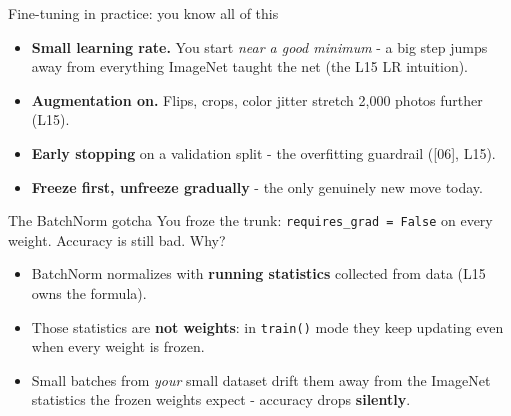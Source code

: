 \documentclass[aspectratio=169]{beamer}
\begin{document}
\begin{frame}{Fine-tuning in practice: you know all of this}
  \begin{itemize}
    \item \textbf{Small learning rate.} You start \emph{near a good minimum} - a big step
      jumps away from everything ImageNet taught the net (the L15 LR intuition).
    \item \textbf{Augmentation on.} Flips, crops, color jitter stretch 2,000 photos
      further (L15).
    \item \textbf{Early stopping} on a validation split - the overfitting guardrail
      ([06], L15).
    \item \textbf{Freeze first, unfreeze gradually} - the only genuinely new move today.
  \end{itemize}
  \vskip 8pt
\end{frame}

\begin{frame}{The BatchNorm gotcha}
  You froze the trunk: \texttt{requires\_grad = False} on every weight. Accuracy is
  still bad. Why?
  \vskip 6pt
  \begin{itemize}
    \item BatchNorm normalizes with \textbf{running statistics} collected from data
      (L15 owns the formula).
    \item Those statistics are \textbf{not weights}: in \texttt{train()} mode they keep
      updating even when every weight is frozen.
    \item Small batches from \emph{your} small dataset drift them away from the ImageNet
      statistics the frozen weights expect - accuracy drops \textbf{silently}.
  \end{itemize}
  \vskip 8pt
\end{frame}
\end{document}
